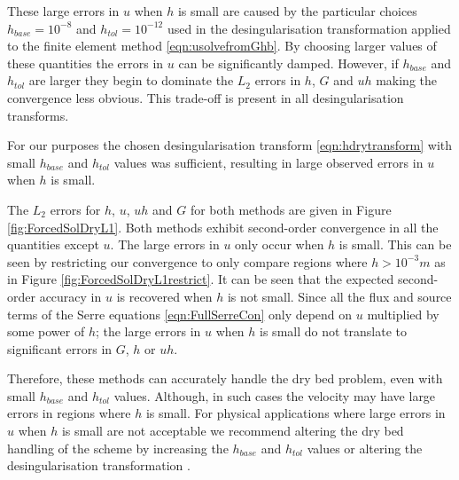 These large errors in $u$ when $h$ is small are caused by the particular choices $h_{{base}} = 10^{-8}$ and $h_{{tol}} = 10^{-12}$ used in the desingularisation transformation applied to the finite element method \eqref{eqn:usolvefromGhb}. By choosing larger values of these quantities the errors in $u$ can be significantly damped. However, if $h_{{base}}$ and $h_{{tol}}$ are larger they begin to dominate the $L_2$ errors in $h$, $G$ and $uh$ making the convergence less obvious. This trade-off is present in all desingularisation transforms. 

For our purposes the chosen desingularisation transform \eqref{eqn:hdrytransform} with small $h_{{base}}$ and $h_{{tol}}$ values was sufficient, resulting in large observed errors in $u$ when $h$ is small.


The $L_2$ errors for $h$, $u$, $uh$ and $G$ for both methods are given in Figure \ref{fig:ForcedSolDryL1}. Both methods exhibit second-order convergence in all the quantities except $u$. The large errors in $u$ only occur when $h$ is small. This can be seen by restricting our convergence to only compare regions where $h > 10^{-3} m$ as in Figure \ref{fig:ForcedSolDryL1restrict}. It can be seen that the expected second-order accuracy in $u$ is recovered when $h$ is not small. Since all the flux and source terms of the Serre equations \eqref{eqn:FullSerreCon} only depend on $u$ multiplied by some power of $h$; the large errors in $u$ when $h$ is small do not translate to significant errors in $G$, $h$ or $uh$. 

Therefore, these methods can accurately handle the dry bed problem, even with small $h_{{base}}$ and $h_{{tol}}$ values. Although, in such cases the velocity may have large errors in regions where $h$ is small. For physical applications where large errors in $u$ when $h$ is small are not acceptable we recommend altering the dry bed handling of the scheme by increasing the $h_{{base}}$ and $h_{{tol}}$ values or altering the desingularisation transformation \cite{Kurganov-Petrova-2007-707}. 


